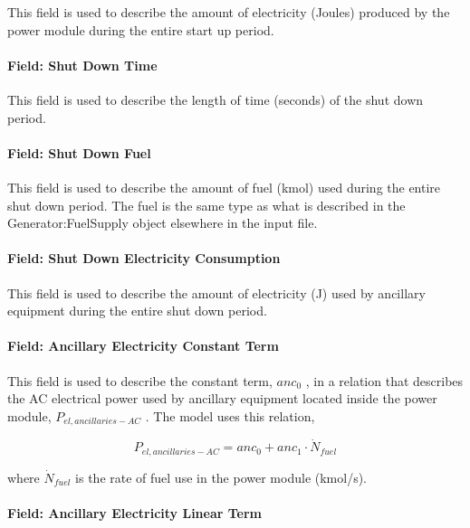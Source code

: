 This field is used to describe the amount of electricity (Joules) produced by the power module during the entire start up period.

\paragraph{Field: Shut Down Time}\label{field-shut-down-time}

This field is used to describe the length of time (seconds) of the shut down period.

\paragraph{Field: Shut Down Fuel}\label{field-shut-down-fuel}

This field is used to describe the amount of fuel (kmol) used during the entire shut down period. The fuel is the same type as what is described in the Generator:FuelSupply object elsewhere in the input file.

\paragraph{Field: Shut Down Electricity Consumption}\label{field-shut-down-electricity-consumption}

This field is used to describe the amount of electricity (J) used by ancillary equipment during the entire shut down period.

\paragraph{Field: Ancillary Electricity Constant Term}\label{field-ancillary-electricity-constant-term}

This field is used to describe the constant term, \(an{c_0}\) , in a relation that describes the AC electrical power used by ancillary equipment located inside the power module, \({P_{el,ancillaries - AC}}\) . The model uses this relation,

\begin{equation}
{P_{el,ancillaries - AC}} = an{c_0} + an{c_1} \cdot {\dot N_{fuel}}
\end{equation}

where \({\dot N_{fuel}}\) is the rate of fuel use in the power module (kmol/s).

\paragraph{Field: Ancillary Electricity Linear Term}\label{field-ancillary-electricity-linear-term}

